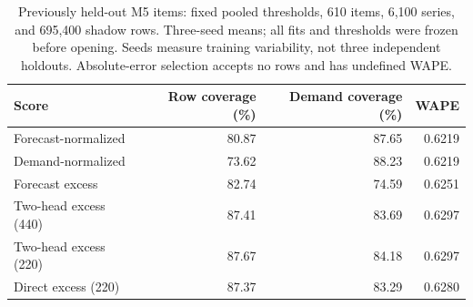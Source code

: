 \begin{table}[t]
\centering\small
\caption{Previously held-out M5 items: fixed pooled thresholds, 610 items, 6,100 series, and 695,400 shadow rows. Three-seed means; all fits and thresholds were frozen before opening. Seeds measure training variability, not three independent holdouts. Absolute-error selection accepts no rows and has undefined WAPE.}
\label{tab:m5guardian}
\begin{tabular}{lrrr}\toprule
Score & Row coverage (\%) & Demand coverage (\%) & WAPE\\\midrule
Forecast-normalized & 80.87 & 87.65 & 0.6219 \\
Demand-normalized & 73.62 & 88.23 & 0.6219 \\
Forecast excess & 82.74 & 74.59 & 0.6251 \\
Two-head excess (440) & 87.41 & 83.69 & 0.6297 \\
Two-head excess (220) & 87.67 & 84.18 & 0.6297 \\
Direct excess (220) & 87.37 & 83.29 & 0.6280 \\
\bottomrule\end{tabular}
\end{table}
